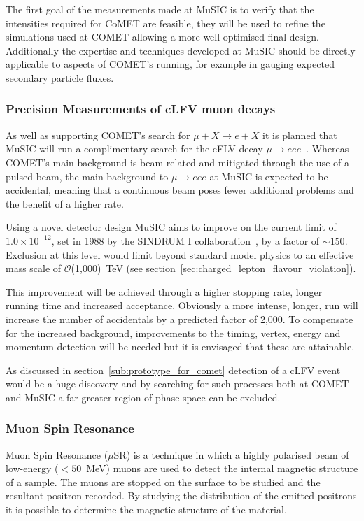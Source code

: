 The first goal of the measurements made at MuSIC is to verify that the intensities required for CoMET are feasible, they will be used to refine the simulations used at COMET allowing a more well optimised final design. Additionally the expertise and techniques developed at MuSIC should be directly applicable to aspects of COMET's running, for example in gauging expected secondary particle fluxes.

\subsubsection{Precision Measurements of cLFV muon decays} %
\label{sub:precision_measurements_of_clfv_muon_decays}
As well as supporting COMET's search for \( \mu + X \rightarrow e + X \) it is planned that MuSIC will run a complimentary search for the cFLV decay \( \mu \rightarrow eee \)~\cite{music_cdr}. Whereas COMET's main background is beam related and mitigated through the use of a pulsed beam, the main background to \( \mu \rightarrow eee \) at MuSIC is expected to be accidental, meaning that a continuous beam poses fewer additional problems and the benefit of a higher rate.

Using a novel detector design MuSIC aims to improve on the current limit of \( 1.0\times10^{-12} \), set in 1988 by the SINDRUM I collaboration~\cite{sindrum_1_mu_eee}, by a factor of \( \sim150 \). Exclusion at this level would limit beyond standard model physics to an effective mass scale of \( \mathcal{O}\)(1,000)~TeV (see section~\ref{sec:charged_lepton_flavour_violation}).

This improvement will be achieved through a higher stopping rate, longer running time and increased acceptance. Obviously a more intense, longer, run will increase the number of accidentals by a predicted factor of 2,000. To compensate for the increased background, improvements to the timing, vertex, energy and momentum detection will be needed but it is envisaged that these are attainable.

As discussed in section~\ref{sub:prototype_for_comet} detection of a cLFV event would be a huge discovery and by searching for such processes both at COMET and MuSIC a far greater region of phase space can be excluded. 

\subsubsection{Muon Spin Resonance} %
\label{sub:muon_spin_resonance}
Muon Spin Resonance (\( \mu \)SR) is a technique in which a highly polarised beam of low-energy (\( <50 \)~MeV) muons are used to detect the internal magnetic structure of a sample. The muons are stopped on the surface to be studied and the resultant positron recorded. By studying the distribution of the emitted positrons it is possible to determine the magnetic structure of the material. 

